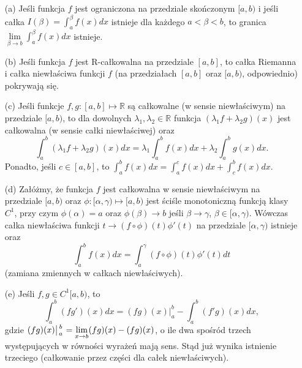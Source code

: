 \documentclass[leqno]{article}
\newcommand{\fracnoline}[2]{\genfrac{}{}{0pt}{}{#1}{#2}}
\begin{document}
\begin{justify}
\begin{theorem}
{
    \begin{itemize}
        \item [(a)]
            Jeśli funkcja $f$ jest ograniczona na przedziale skończonym $[a,b)$ i jeśli całka $I(\beta) = \int_{a}^{\beta} f(x)dx$ istnieje dla
            każdego $a < \beta < b$, to granica $\lim\limits_{\beta \to b} \int_{a}^{\beta}f(x)dx$ istnieje.
        \item [(b)]
            Jeśli funkcja $f$ jest R-całkowalna na przedziale $[a,b]$, to całka Riemanna i całka niewłaściwa funkcji $f$
            (na przedziałach $[a,b]$ oraz $[a,b)$, odpowiednio) pokrywają się.
        \item [(c)]
            Jeśli funkcje $f, g : [a,b] \mapsto \mathbb{R}$ są całkowalne (w sensie niewłaściwym) na przedziale $[a,b)$, to dla dowolnych
            $\lambda_1, \lambda_2 \in \mathbb{R}$ funkcja $(\lambda_1f + \lambda_2 g)(x)$ jest całkowalna (w sensie całki niewłaściwej) oraz
            \[
                \int_{a}^{b}(\lambda_1 f + \lambda_2 g)(x)dx = \lambda_1 \int_{a}^{b}f(x)dx + \lambda_2 \int_{a}^{b}g(x)dx.
            \]
            Ponadto, jeśli $c \in [a,b]$, to $\int_{a}^{b}f(x)dx = \int_{a}^{c}f(x)dx + \int_{c}^{b}f(x)dx$.
        \item [(d)]
            Załóżmy, że funkcja $f$ jest całkowalna w sensie niewłaściwym na przedziale $[a,b)$ oraz $\phi : [\alpha, \gamma) \mapsto [a,b)$ jest ściśle monotoniczną
            funkcją klasy $C^1$, przy czym $\phi(\alpha) = a$ oraz $\phi(\beta) \to b$ jeśli $\beta \to \gamma$, $\beta \in [\alpha, \gamma)$. 
            Wówczas całka niewłaściwa funkcji $t \to (f \circ \phi)(t)\phi'(t)$ na przedziale $[\alpha, \gamma)$ istnieje oraz
            \[
                \int_{a}^{b}f(x)dx = \int_{a}^{\gamma}(f \circ \phi)(t)\phi'(t)dt
            \]
            (zamiana zmiennych w całkach niewłaściwych).
        \item [(e)]
            Jeśli $f, g \in C^1[a,b)$, to
            \[
                \int_{a}^{b}(fg')(x)dx = (fg)(x)\big|_a^b - \int_{a}^{b}(f'g)(x)dx,
            \]
            gdzie $(fg)(x)\big|\fracnoline{b}{a} = \lim\limits_{x \to b}(fg)(x) - (fg)(x)$, o ile dwa spośród trzech występujących w równości wyrażeń mają sens.
            Stąd już wynika istnienie trzeciego (całkowanie przez części dla całek niewłaściwych). 
    \end{itemize}    
}
\end{theorem}

\newpage


\end{justify}
\end{document}
